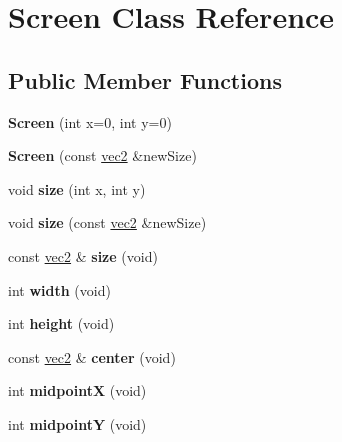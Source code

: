 \hypertarget{class_screen}{\section{Screen Class Reference}
\label{class_screen}
}
\subsection*{Public Member Functions}
\begin{DoxyCompactItemize}
\item 
\hypertarget{class_screen_ad97151af2e654778bad86043c32fe19f}{{\bfseries Screen} (int x=0, int y=0)}\label{class_screen_ad97151af2e654778bad86043c32fe19f}

\item 
\hypertarget{class_screen_a7b45282430392ffa8b5891936363f8f8}{{\bfseries Screen} (const \hyperlink{struct_angel_1_1vec2}{vec2} \&new\-Size)}\label{class_screen_a7b45282430392ffa8b5891936363f8f8}

\item 
\hypertarget{class_screen_a24e5be647130c965757db6cb9617fbe1}{void {\bfseries size} (int x, int y)}\label{class_screen_a24e5be647130c965757db6cb9617fbe1}

\item 
\hypertarget{class_screen_a2c027dc96b9133619687f21fd92d66ba}{void {\bfseries size} (const \hyperlink{struct_angel_1_1vec2}{vec2} \&new\-Size)}\label{class_screen_a2c027dc96b9133619687f21fd92d66ba}

\item 
\hypertarget{class_screen_a7c7219ac566e00e09bf3dd7df1a19ccd}{const \hyperlink{struct_angel_1_1vec2}{vec2} \& {\bfseries size} (void)}\label{class_screen_a7c7219ac566e00e09bf3dd7df1a19ccd}

\item 
\hypertarget{class_screen_aa411196a9c73a097e23e5e2cc6f4fb6d}{int {\bfseries width} (void)}\label{class_screen_aa411196a9c73a097e23e5e2cc6f4fb6d}

\item 
\hypertarget{class_screen_a492352f72fd2ee5f3cadcd553539bab1}{int {\bfseries height} (void)}\label{class_screen_a492352f72fd2ee5f3cadcd553539bab1}

\item 
\hypertarget{class_screen_ab1031780f278f25b9ad4efc0379e12fd}{const \hyperlink{struct_angel_1_1vec2}{vec2} \& {\bfseries center} (void)}\label{class_screen_ab1031780f278f25b9ad4efc0379e12fd}

\item 
\hypertarget{class_screen_a8ebfcb6f8f6a01c9397b0255e7e07b3e}{int {\bfseries midpoint\-X} (void)}\label{class_screen_a8ebfcb6f8f6a01c9397b0255e7e07b3e}

\item 
\hypertarget{class_screen_a4c579b4f3e27635f30b912d90a6b53d7}{int {\bfseries midpoint\-Y} (void)}\label{class_screen_a4c579b4f3e27635f30b912d90a6b53d7}

\end{DoxyCompactItemize}
